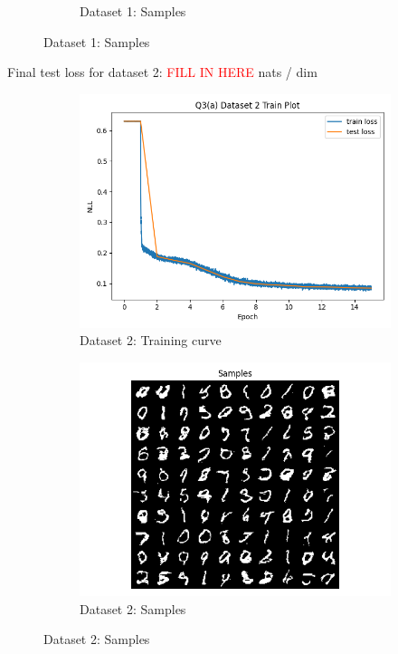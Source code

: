 \documentclass{article}
\begin{document}
\begin{enumerate}[(a)]
\begin{figure}[H]
\begin{subfigure}{0.45\textwidth}
        \caption{Dataset 1: Samples}
    \end{subfigure}
\end{figure}
Final test loss for dataset 2: \textcolor{red}{FILL IN HERE}  nats / dim
\begin{figure}[H]
    \centering
    \begin{subfigure}{0.45\textwidth}
        \centering
        \includegraphics[width=\textwidth]{figures/q3_a_dset2_train_plot.png}
        \caption{Dataset 2: Training curve}
    \end{subfigure}
    \hspace{0.2in}
    \begin{subfigure}{0.45\textwidth}
        \centering
        \includegraphics[width=\textwidth]{figures/q3_a_dset2_samples.png}
        \caption{Dataset 2: Samples}
    \end{subfigure}
\end{figure}


\end{enumerate}
\end{document}
